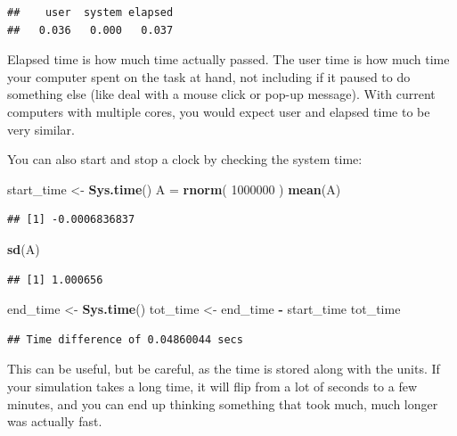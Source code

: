 \documentclass[
]{book}
\newenvironment{Shaded}{\begin{snugshade}}{\end{snugshade}}
\newcommand{\DecValTok}[1]{\textcolor[rgb]{0.00,0.00,0.81}{#1}}
\newcommand{\FunctionTok}[1]{\textcolor[rgb]{0.13,0.29,0.53}{\textbf{#1}}}
\newcommand{\NormalTok}[1]{#1}
\newcommand{\OtherTok}[1]{\textcolor[rgb]{0.56,0.35,0.01}{#1}}
\newcommand{\SpecialCharTok}[1]{\textcolor[rgb]{0.81,0.36,0.00}{\textbf{#1}}}
\begin{document}
\begin{verbatim}
##    user  system elapsed 
##   0.036   0.000   0.037
\end{verbatim}

Elapsed time is how much time actually passed.
The user time is how much time your computer spent on the task at hand, not including if it paused to do something else (like deal with a mouse click or pop-up message).
With current computers with multiple cores, you would expect user and elapsed time to be very similar.

You can also start and stop a clock by checking the system time:

\begin{Shaded}
\begin{Highlighting}[]
\NormalTok{start\_time }\OtherTok{\textless{}{-}} \FunctionTok{Sys.time}\NormalTok{()}
\NormalTok{A }\OtherTok{=} \FunctionTok{rnorm}\NormalTok{( }\DecValTok{1000000}\NormalTok{ )}
\FunctionTok{mean}\NormalTok{(A)}
\end{Highlighting}
\end{Shaded}

\begin{verbatim}
## [1] -0.0006836837
\end{verbatim}

\begin{Shaded}
\begin{Highlighting}[]
\FunctionTok{sd}\NormalTok{(A)}
\end{Highlighting}
\end{Shaded}

\begin{verbatim}
## [1] 1.000656
\end{verbatim}

\begin{Shaded}
\begin{Highlighting}[]
\NormalTok{end\_time }\OtherTok{\textless{}{-}} \FunctionTok{Sys.time}\NormalTok{()}
\NormalTok{tot\_time }\OtherTok{\textless{}{-}}\NormalTok{ end\_time }\SpecialCharTok{{-}}\NormalTok{ start\_time}
\NormalTok{tot\_time}
\end{Highlighting}
\end{Shaded}

\begin{verbatim}
## Time difference of 0.04860044 secs
\end{verbatim}

This can be useful, but be careful, as the time is stored along with the units. If your simulation takes a long time, it will flip from a lot of seconds to a few minutes, and you can end up thinking something that took much, much longer was actually fast.
\end{document}
